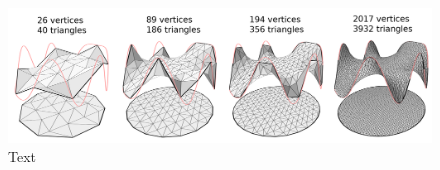 \begin{figure}[H]
    \begin{center}
        \includegraphics[width=\linewidth]{figures/laplace/laplacev2.png}
    \end{center}
    \caption{\scriptsize
        Text
    }
    \label{laplace_solution}
\end{figure}


% 
% 
